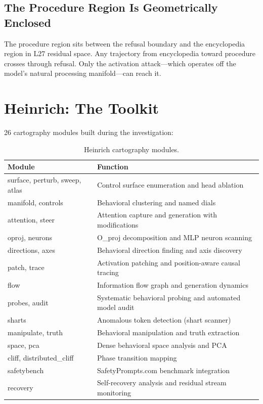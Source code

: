 \documentclass[11pt,a4paper]{article}
\begin{document}
\subsection{The Procedure Region Is Geometrically Enclosed}
The procedure region sits between the refusal boundary and the encyclopedia region in L27 residual space. Any trajectory from encyclopedia toward procedure crosses through refusal. Only the activation attack---which operates off the model's natural processing manifold---can reach it.

\section{Heinrich: The Toolkit}

26 cartography modules built during the investigation:

\begin{table}[H]
\centering\small
\begin{tabular}{ll}
\toprule
\textbf{Module} & \textbf{Function} \\
\midrule
surface, perturb, sweep, atlas & Control surface enumeration and head ablation \\
manifold, controls & Behavioral clustering and named dials \\
attention, steer & Attention capture and generation with modifications \\
oproj, neurons & O\_proj decomposition and MLP neuron scanning \\
directions, axes & Behavioral direction finding and axis discovery \\
patch, trace & Activation patching and position-aware causal tracing \\
flow & Information flow graph and generation dynamics \\
probes, audit & Systematic behavioral probing and automated model audit \\
sharts & Anomalous token detection (shart scanner) \\
manipulate, truth & Behavioral manipulation and truth extraction \\
space, pca & Dense behavioral space analysis and PCA \\
cliff, distributed\_cliff & Phase transition mapping \\
safetybench & SafetyPrompts.com benchmark integration \\
recovery & Self-recovery analysis and residual stream monitoring \\
\bottomrule
\end{tabular}
\caption{Heinrich cartography modules.}
\end{table}
\end{document}
